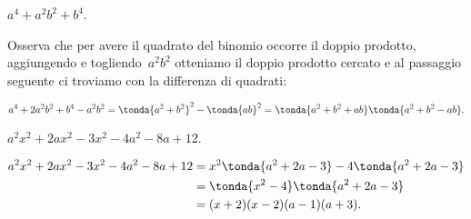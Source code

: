 % 
% 
% 
% 
% 
% 
% 
% 

 \begin{esempio}
 \(a^4+a^{2}b^{2}+b^4\).

Osserva che per avere il quadrato del binomio occorre il doppio
prodotto, aggiungendo e togliendo~\(a^{2}b^{2}\) otteniamo il doppio
prodotto cercato e al passaggio seguente ci troviamo con la differenza
di quadrati:

\[a^4+2a^2b^2+b^4 -a^2b^2=\tonda{a^2+b^2}^2-\tonda{ab}^2%
 =\tonda{a^2+b^2+ab}\tonda{a^2+b^2-ab}.\]

 \end{esempio}
% 
% 

 \begin{esempio}
 \(a^{2}x^2+2ax^2-3x^2-4a^{2}-8a+12\).

 \begin{align*}
  a^{2}x^2+2ax^2-3x^2-4a^{2}-8a+12&=
  x^2\tonda{a^{2}+2a-3}-4\tonda{a^{2}+2a-3}\\
  &=\tonda{x^2-4}\tonda{a^{2}+2a-3}\\
  &=(x+2)(x-2)(a-1)(a+3).\\
 \end{align*}
 \end{esempio}

